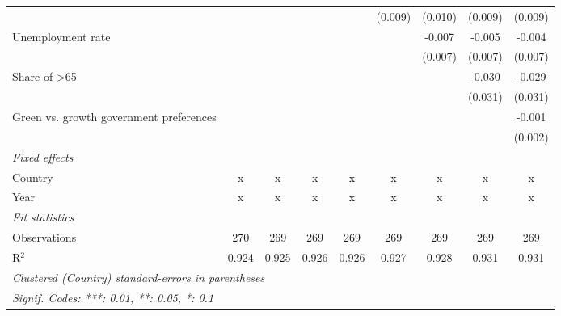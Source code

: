 \begin{table}[htbp]
\begin{tabular}{lcccccccc}
                                                                               &         &         &         &         & (0.009) & (0.010) & (0.009) & (0.009)\\   
      Unemployment rate                                                        &         &         &         &         &         & -0.007  & -0.005  & -0.004\\   
                                                                               &         &         &         &         &         & (0.007) & (0.007) & (0.007)\\   
      Share of >65                                                             &         &         &         &         &         &         & -0.030  & -0.029\\   
                                                                               &         &         &         &         &         &         & (0.031) & (0.031)\\   
      Green vs. growth government preferences                                  &         &         &         &         &         &         &         & -0.001\\   
                                                                               &         &         &         &         &         &         &         & (0.002)\\   
      \emph{Fixed effects}\\
      Country                                                                  & x       & x       & x       & x       & x       & x       & x       & x\\  
      Year                                                                     & x       & x       & x       & x       & x       & x       & x       & x\\  
      \midrule \emph{Fit statistics}\\
      Observations                                                             & 270     & 269     & 269     & 269     & 269     & 269     & 269     & 269\\  
      R$^2$                                                                    & 0.924   & 0.925   & 0.926   & 0.926   & 0.927   & 0.928   & 0.931   & 0.931\\  
      \midrule
      \multicolumn{9}{l}{\emph{Clustered (Country) standard-errors in parentheses}}\\
      \multicolumn{9}{l}{\emph{Signif. Codes: ***: 0.01, **: 0.05, *: 0.1}}\\
   \end{tabular}
\end{table}


